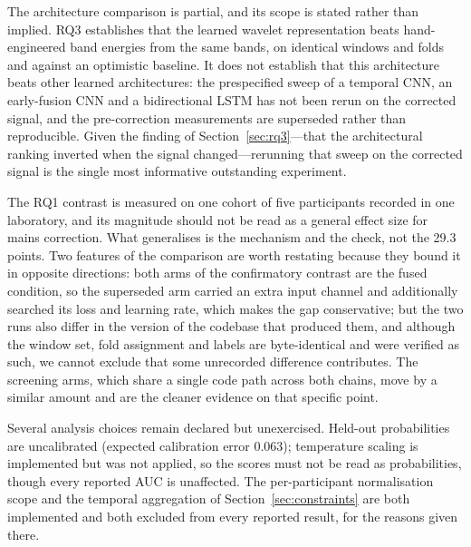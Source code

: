\documentclass[pdflatex,sn-nature,iicol]{sn-jnl}
\begin{document}
The architecture comparison is partial, and its scope is stated rather than implied. RQ3 establishes that the learned wavelet representation beats hand-engineered band energies from the same bands, on identical windows and folds and against an optimistic baseline. It does not establish that this architecture beats other learned architectures: the prespecified sweep of a temporal CNN, an early-fusion CNN and a bidirectional LSTM has not been rerun on the corrected signal, and the pre-correction measurements are superseded rather than reproducible. Given the finding of Section~\ref{sec:rq3}---that the architectural ranking inverted when the signal changed---rerunning that sweep on the corrected signal is the single most informative outstanding experiment.

The RQ1 contrast is measured on one cohort of five participants recorded in one laboratory, and its magnitude should not be read as a general effect size for mains correction. What generalises is the mechanism and the check, not the 29.3 points. Two features of the comparison are worth restating because they bound it in opposite directions: both arms of the confirmatory contrast are the fused condition, so the superseded arm carried an extra input channel and additionally searched its loss and learning rate, which makes the gap conservative; but the two runs also differ in the version of the codebase that produced them, and although the window set, fold assignment and labels are byte-identical and were verified as such, we cannot exclude that some unrecorded difference contributes. The screening arms, which share a single code path across both chains, move by a similar amount and are the cleaner evidence on that specific point.

Several analysis choices remain declared but unexercised. Held-out probabilities are uncalibrated (expected calibration error 0.063); temperature scaling is implemented but was not applied, so the scores must not be read as probabilities, though every reported AUC is unaffected. The per-participant normalisation scope and the temporal aggregation of Section~\ref{sec:constraints} are both implemented and both excluded from every reported result, for the reasons given there.
\end{document}
